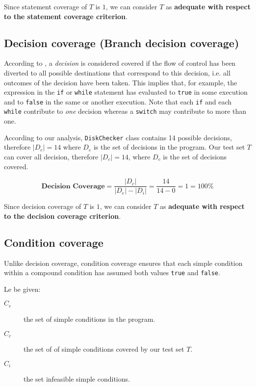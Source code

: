 \documentclass[conference]{IEEEtran}
\newcommand{\abs}[1]{\left|#1\right|}
\begin{document}
Since statement coverage of $T$ is $1$, we can consider $T$ as \textbf{adequate with respect to the statement coverage criterion}.

\subsection{Decision coverage (Branch decision coverage)}

According to \cite{FoundationSoftwareTesting}, a \textit{decision} is considered covered if the flow of control has been diverted to all possible destinations that correspond to this decision, i.e. all outcomes of the decision have been taken. This implies that, for example, the expression in the \texttt{if} or \texttt{while} statement has evaluated to \texttt{true} in some execution and to \texttt{false} in the same or another execution. Note that each \texttt{if} and each \texttt{while} contribute to \textit{one} decision whereas a \texttt{switch} may contribute to more than one.

According to our analysis, \texttt{DiskChecker} class contains 14 possible decisions, therefore $\abs{D_e} = 14$ where $D_e$ is the set of decisions in the program. Our test set $T$ can cover all decision, therefore $\abs{D_c} = 14$, where $D_c$ is the set of decisions covered.

\begin{equation} 
\textbf{Decision Coverage} = \dfrac{\abs{D_c}}{\abs{D_e} - \abs{D_i}} = \dfrac{14}{14-0} = 1 = 100\%
\end{equation}

Since decision coverage of $T$ is $1$, we can consider $T$ as \textbf{adequate with respect to the decision coverage criterion}.

\subsection{Condition coverage}

Unlike decision coverage, condition coverage ensures that each simple condition within a compound condition has assumed both values \texttt{true} and \texttt{false}. 

Le be given:

\begin{description}
\item[$C_e$] the set of simple conditions in the program.
\item[$C_c$] the set of of simple conditions covered  by our test set $T$.
\item[$C_i$] the set infeasible simple conditions.
\end{description}
\end{document}
